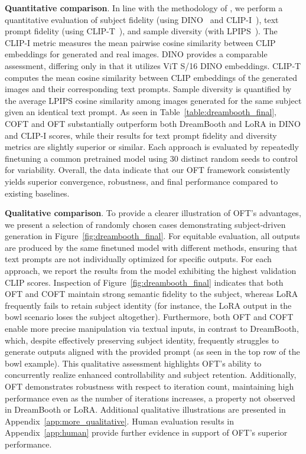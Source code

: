 \textbf{Quantitative comparison}. In line with the methodology of \cite{ruiz2023dreambooth}, we perform a quantitative evaluation of subject fidelity (using DINO~\cite{caron2021emerging} and CLIP-I~\cite{radford2021learning}), text prompt fidelity (using CLIP-T~\cite{radford2021learning}), and sample diversity (with LPIPS~\cite{zhang2018unreasonable}). The CLIP-I metric measures the mean pairwise cosine similarity between CLIP embeddings for generated and real images. DINO provides a comparable assessment, differing only in that it utilizes ViT S/16 DINO embeddings. CLIP-T computes the mean cosine similarity between CLIP embeddings of the generated images and their corresponding text prompts. Sample diversity is quantified by the average LPIPS cosine similarity among images generated for the same subject given an identical text prompt. As seen in Table~\ref{table:dreambooth_final}, COFT and OFT substantially outperform both DreamBooth and LoRA in DINO and CLIP-I scores, while their results for text prompt fidelity and diversity metrics are slightly superior or similar. Each approach is evaluated by repeatedly finetuning a common pretrained model using 30 distinct random seeds to control for variability. Overall, the data indicate that our OFT framework consistently yields superior convergence, robustness, and final performance compared to existing baselines.

\textbf{Qualitative comparison}. To provide a clearer illustration of OFT's advantages, we present a selection of randomly chosen cases demonstrating subject-driven generation in Figure~\ref{fig:dreambooth_final}. For equitable evaluation, all outputs are produced by the same finetuned model with different methods, ensuring that text prompts are not individually optimized for specific outputs. For each approach, we report the results from the model exhibiting the highest validation CLIP scores. Inspection of Figure~\ref{fig:dreambooth_final} indicates that both OFT and COFT maintain strong semantic fidelity to the subject, whereas LoRA frequently fails to retain subject identity (for instance, the LoRA output in the bowl scenario loses the subject altogether). Furthermore, both OFT and COFT enable more precise manipulation via textual inputs, in contrast to DreamBooth, which, despite effectively preserving subject identity, frequently struggles to generate outputs aligned with the provided prompt (as seen in the top row of the bowl example). This qualitative assessment highlights OFT’s ability to concurrently realize enhanced controllability and subject retention. Additionally, OFT demonstrates robustness with respect to iteration count, maintaining high performance even as the number of iterations increases, a property not observed in DreamBooth or LoRA. Additional qualitative illustrations are presented in Appendix~\ref{app:more_qualitative}. Human evaluation results in Appendix~\ref{app:human} provide further evidence in support of OFT's superior performance.

